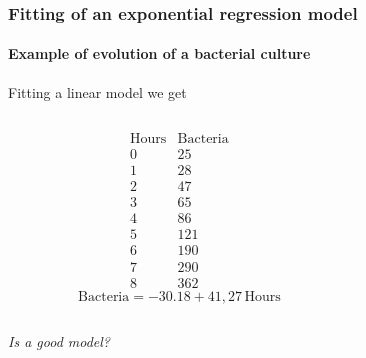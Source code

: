 \begin{frame}
\frametitle{Fitting of an exponential regression model}
\framesubtitle{Example of evolution of a bacterial culture}
Fitting a linear model we get
\begin{columns}
\begin{column}{0.3\textwidth}
\[
\begin{array}{c|c}
\mbox{Hours} & \mbox{Bacteria}\\
\hline
0 &  25 \\
1 & 28 \\
2 &  47\\
3 & 65 \\
4 & 86\\
5 & 121\\
6 & 190\\
7 & 290\\
8 & 362
\end{array}
\]
\[
\mbox{Bacteria} = -30.18+41,27\,\mbox{Hours}
\]
\end{column}
\begin{column}{0.6\textwidth}
\begin{center}
\resizebox{0.9\textwidth}{!}{}
\end{center}
\end{column}
\end{columns}
\begin{center}
\emph{Is a good model?}
\end{center}
\end{frame}

